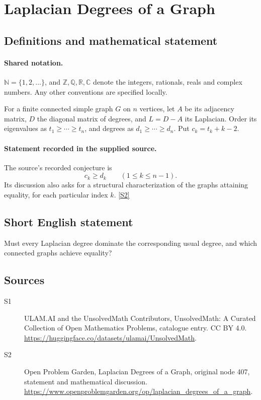 \documentclass[11pt]{article}
\newcommand{\sref}[2]{\hyperlink{source:#1:#2}{[S#2]}}
\begin{document}
\section{Laplacian Degrees of a Graph}\label{statement}

\subsection{Definitions and mathematical statement}

\paragraph{Shared notation.}$\mathbb N=\{1,2,\ldots\}$, and $\mathbb Z,\mathbb Q,\mathbb R,\mathbb C$ denote the integers, rationals, reals and complex numbers. Any other conventions are specified locally.


For a finite connected simple graph $G$ on $n$ vertices, let $A$ be its adjacency matrix, $D$ the diagonal matrix of degrees, and $L=D-A$ its Laplacian. Order its eigenvalues as $t_1\ge\cdots\ge t_n$, and degrees as $d_1\ge\cdots\ge d_n$. Put $c_k=t_k+k-2$.
\paragraph{Statement recorded in the supplied source.}
The source's recorded conjecture is \[c_k\ge d_k\qquad(1\le k\le n-1).\] Its discussion also asks for a structural characterization of the graphs attaining equality, for each particular index $k$. \sref{statement}{2}
\subsection{Short English statement}
Must every Laplacian degree dominate the corresponding usual degree, and which connected graphs achieve equality?
\subsection{Sources}
\begin{description}
\item[\hypertarget{source:statement:1}{S1}] ULAM.AI and the UnsolvedMath Contributors, UnsolvedMath: A Curated Collection of Open Mathematics Problems, catalogue entry. CC BY 4.0. \url{https://huggingface.co/datasets/ulamai/UnsolvedMath}.
\item[\hypertarget{source:statement:2}{S2}] Open Problem Garden, Laplacian Degrees of a Graph, original node 407, statement and mathematical discussion. \url{https://www.openproblemgarden.org/op/laplacian_degrees_of_a_graph}.
\end{description}
\label{end:statement}
\end{document}
